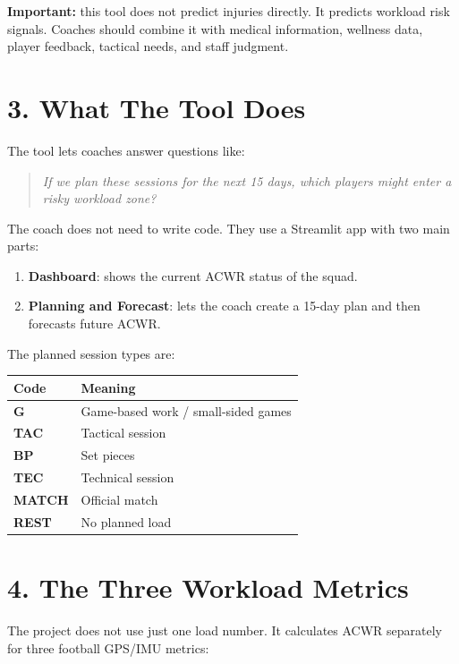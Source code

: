\documentclass[11pt,a4paper]{article}
\begin{document}
\textbf{Important:} this tool does not predict injuries directly. It predicts workload risk signals. Coaches should combine it with medical information, wellness data, player feedback, tactical needs, and staff judgment.

\section*{3. What The Tool Does}

The tool lets coaches answer questions like:

\begin{quote}
\textit{If we plan these sessions for the next 15 days, which players might enter a risky workload zone?}
\end{quote}

The coach does not need to write code. They use a Streamlit app with two main parts:

\begin{enumerate}
  \item \textbf{Dashboard}: shows the current ACWR status of the squad.
  \item \textbf{Planning and Forecast}: lets the coach create a 15-day plan and then forecasts future ACWR.
\end{enumerate}

The planned session types are:

\begin{center}
\begin{tabular}{>{\bfseries}p{2.5cm}p{8cm}}
\toprule
Code & Meaning \\
\midrule
G & Game-based work / small-sided games \\
TAC & Tactical session \\
BP & Set pieces \\
TEC & Technical session \\
MATCH & Official match \\
REST & No planned load \\
\bottomrule
\end{tabular}
\end{center}

\section*{4. The Three Workload Metrics}

The project does not use just one load number. It calculates ACWR separately for three football GPS/IMU metrics:
\end{document}
